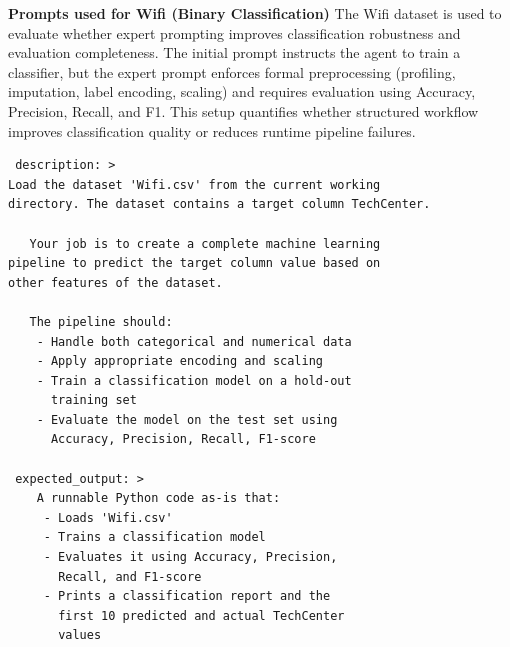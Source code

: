 \newpage

\textbf{Prompts used for Wifi (Binary Classification)}  
The Wifi dataset is used to evaluate whether expert prompting improves classification robustness and evaluation completeness.  
The initial prompt instructs the agent to train a classifier, but the expert prompt enforces formal preprocessing (profiling, imputation, label encoding, scaling) and requires evaluation using Accuracy, Precision, Recall, and F1. This setup quantifies whether structured workflow improves classification quality or reduces runtime pipeline failures.

\begin{tcolorbox}[ left=2pt,   right=2pt,   top=2pt,   bottom=2pt, colback=gray!5,colframe=black!40,title={Initial prompt (No Expertise)}]
\scriptsize
\setlength{\baselineskip}{0.6\baselineskip} \begin{verbatim}
 description: >
Load the dataset 'Wifi.csv' from the current working 
directory. The dataset contains a target column TechCenter.

   Your job is to create a complete machine learning 
pipeline to predict the target column value based on 
other features of the dataset.

   The pipeline should:
    - Handle both categorical and numerical data
    - Apply appropriate encoding and scaling
    - Train a classification model on a hold-out 
      training set
    - Evaluate the model on the test set using 
      Accuracy, Precision, Recall, F1-score

 expected_output: >
    A runnable Python code as-is that:
     - Loads 'Wifi.csv'
     - Trains a classification model
     - Evaluates it using Accuracy, Precision, 
       Recall, and F1-score
     - Prints a classification report and the 
       first 10 predicted and actual TechCenter 
       values
\end{verbatim}
\end{tcolorbox}


